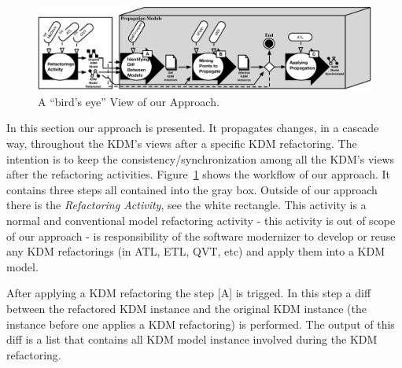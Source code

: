 %


\begin{figure}[t]
	\centering
	\includegraphics[scale=0.545]{figuras/ApproachLifeCicle2}
	\caption{A ``bird's eye'' View of our Approach.}
	\label{fig:approach}
\end{figure}

In this section our approach is presented. It propagates changes, in a cascade way, throughout the KDM's views after a specific KDM refactoring. The intention is to keep the consistency/synchronization among all the KDM's views after the refactoring activities.
%
%
%
Figure~\ref{fig:approach} shows the workflow of our approach. It contains three steps all contained into the gray box. Outside of our approach there is the \textit{Refactoring Activity}, see the white rectangle. This activity is a normal and conventional model refactoring activity - this activity is out of scope of our approach - is responsibility of the software modernizer to develop or reuse any KDM refactorings (in ATL, ETL, QVT, etc) and apply them into a KDM model. %

After applying a KDM refactoring the step [A] is trigged. In this step a diff between the refactored KDM instance and the original KDM instance (the instance before one applies a KDM refactoring) is performed. The output of this diff is a list that contains all KDM model instance involved during the KDM refactoring. %

